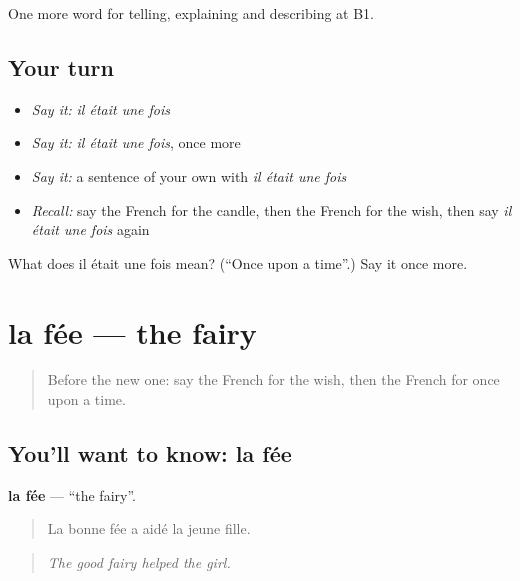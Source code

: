 \begin{grammarlens}[title={What you've built}]
One more word for telling, explaining and describing at B1.
\end{grammarlens}

\subsection*{Your turn}
\begin{itemize}
\raggedright
  \item \emph{Say it:} \emph{il était une fois}
  \item \emph{Say it:} \emph{il était une fois}, once more
  \item \emph{Say it:} a sentence of your own with \emph{il était une fois}
  \item \emph{Recall:} say the French for the candle, then the French for the wish, then say \emph{il était une fois} again
\end{itemize}

\begin{tcolorbox}[breakable,colback=teal!4,colframe=teal!35!black,title={Before you move on}]
What does il était une fois mean? (\textquotedblleft{}Once upon a time\textquotedblright{}.) Say it once more.
\end{tcolorbox}
\section[la fée]{la fée — the fairy}

\label{lesson:FR-C321-fee}



\begin{quote}
Before the new one: say the French for the wish, then the French for once upon a time.
\end{quote}

\subsection*{You'll want to know: la fée}
\textbf{la fée} — \textquotedblleft{}the fairy\textquotedblright{}.

\begin{quote}
La bonne fée a aidé la jeune fille.
\end{quote}

\begin{quote}
\emph{The good fairy helped the girl.}
\end{quote}

